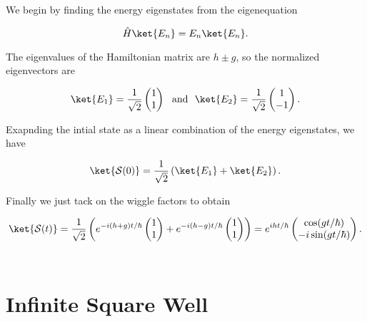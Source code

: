 \documentclass[a4paper,12pt]{report}
\begin{document}
{We begin by finding the energy eigenstates from the eigenequation

\begin{equation}
  \hat{H} \ket{E_{n} } = E_{n} \ket{E_{n} }.  
\end{equation}

The eigenvalues of the Hamiltonian matrix are \(h \pm g\), so the normalized eigenvectors are 

\begin{equation}
  \ket{E_{1} } = \frac{1}{\sqrt{2} } \begin{pmatrix}
     1 \\
     1 \\
  \end{pmatrix} ~\text { and }~ \ket{E_2 } = \frac{1}{\sqrt{2} } \begin{pmatrix}
     1 \\
     -1 \\
  \end{pmatrix}.  
\end{equation}

Exapnding the intial state as a linear combination of the energy eigenstates, we have 

\begin{equation}
  \ket{\mathcal{S}(0)} = \frac{1}{\sqrt{2} } \left( \ket{E_1 } + \ket{E_2 }   \right).  
\end{equation}

Finally we just tack on the wiggle factors to obtain 

\begin{equation}
  \ket{\mathcal{S}(t) } = \frac{1}{\sqrt{2}} \left( e^{-i(h+g)t /\hbar } \begin{pmatrix}
     1 \\
     1 \\
  \end{pmatrix} + e^{-i(h-g)t /\hbar } \begin{pmatrix}
     1 \\
     1 \\
  \end{pmatrix}   \right) = e^{i h t/\hbar } \begin{pmatrix}
     \cos (gt /\hbar ) \\
     -i \sin (gt /\hbar ) \\
  \end{pmatrix}  .
\end{equation}~
} 

\section{Infinite Square Well}
\end{document}
